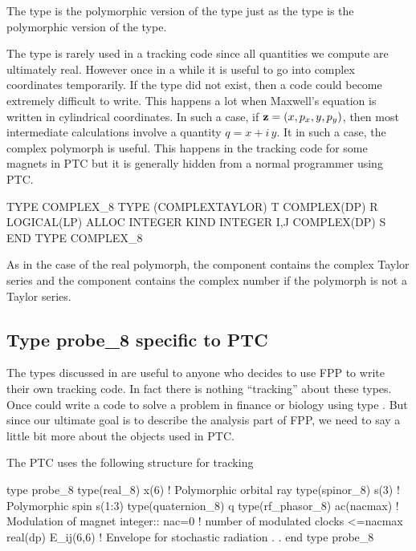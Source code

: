 \documentclass[english,12pt,article]{article} %
\begin{document}
The type  is the polymorphic version of the  type just as the  type is the polymorphic version of the  type.

The type  is rarely used in a tracking code since all quantities we compute are ultimately real. However once in a while it is useful to go into complex coordinates temporarily. If the type  did not exist, then a code could become extremely difficult to write. This happens a lot when Maxwell's equation is written in cylindrical coordinates. In such a case, if ${\bf z}=(x,p_x,y,p_y)$, then most intermediate calculations involve a quantity $q=x+i\,y$. It in such a case, the complex polymorph is useful. This happens in the tracking code for some magnets in PTC but it is generally hidden from a normal programmer using PTC. 
 
\begin{example1}
  TYPE COMPLEX_8
    TYPE (COMPLEXTAYLOR) T 
    COMPLEX(DP) R
    LOGICAL(LP) ALLOC
    INTEGER KIND
    INTEGER I,J 
    COMPLEX(DP) S
  END TYPE COMPLEX_8
\end{example1}
  
 As in the case of the real polymorph, the  component contains the complex Taylor series and the  component contains the complex number if the polymorph is not a Taylor series. 
  
  \subsection{Type probe_8 specific to PTC}\label{sec:codetype}

The types discussed in  are useful to anyone who decides to use FPP to write their own tracking code. In fact there is nothing ``tracking'' about these types. Once could write a code to solve a problem in finance or biology using  type . But since our ultimate goal is to describe the analysis part of FPP, we need to say a little bit more about the objects used in PTC.

The PTC uses the following structure for tracking 
\begin{example}
  type probe_8
    type(real_8) x(6)     ! Polymorphic orbital ray
    type(spinor_8) s(3)   ! Polymorphic spin s(1:3)
    type(quaternion_8) q 
    type(rf_phasor_8)  ac(nacmax)  ! Modulation of magnet
    integer:: nac=0 !  number of modulated clocks <=nacmax
    real(dp) E_ij(6,6)   !  Envelope for stochastic radiation
          .
          .
  end type probe_8
\end{example}
\end{document}
